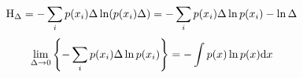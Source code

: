 $${\rm H}_ \Delta = - \sum _i p(x_i) \Delta \ln (p(x_i)\Delta) = -\sum_i p(x_i)\Delta\ln p(x_i) - \ln \Delta $$
$$\lim_{\Delta \rightarrow 0}\left\{ - \sum_i p(x_i) \Delta \ln p(x_i)\right\} = - \int p(x)\ln p(x) {\rm d}x $$
